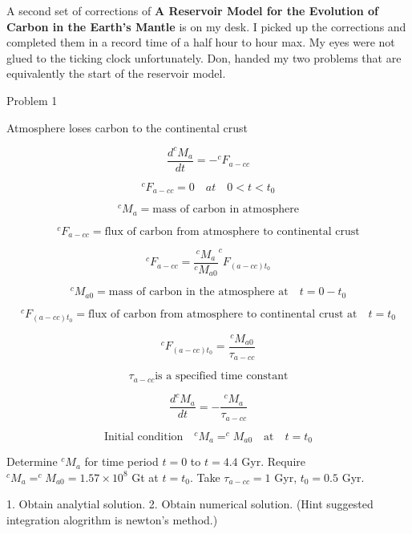 A second set of corrections of \textbf{A Reservoir Model for the Evolution of Carbon in the Earth's Mantle} is on my desk. I picked up the corrections and completed them in a record time of a half hour to hour max. My eyes were not glued to the ticking clock unfortunately. Don, handed my two problems that are equivalently the start of the reservoir model. 

Problem 1

Atmosphere loses carbon to the continental crust

\begin{equation}
  \frac{d^{c}M_{a}}{dt} = -^{c}F_{a-cc}
\end{equation}

\begin{equation}
  ^{c}F_{a-cc} = 0 \quad at \quad 0 < t < t_0
\end{equation}

\begin{equation}
  ^{c}M_{a} = \text{mass of carbon in atmosphere}
\end{equation}

\begin{equation}
  ^{c}F_{a-cc} = \text{flux of carbon from atmosphere to continental crust}
\end{equation}

\begin{equation}
  ^{c}F_{a-cc} = \frac{^{c}M_{a}}{^{c}M_{a0}} ^{c}F_{(a-cc)t_{0}}
\end{equation}

\begin{equation}
  ^{c}M_{a0} = \text{mass of carbon in the atmosphere at} \quad t = 0 - t_{0}
\end{equation}

\begin{equation}
  ^{c}F_{(a-cc)t_{0}} = \text{flux of carbon from atmosphere to continental crust at} \quad t=t_0
\end{equation}

\begin{equation}
  ^{c}F_{(a-cc)t_{0}} = \frac{^{c}M_{a0}}{\tau_{a-cc}}
\end{equation}

\begin{equation}
  \tau_{a-cc} \text{is a specified time constant}
\end{equation}

\begin{equation}
  \frac{d^{c}M_{a}}{dt} = - \frac{^{c}M_a}{\tau_{a-cc}}
\end{equation}

\begin{equation}
  \text{Initial condition} \quad ^{c}M_{a} = ^{c}M_{a0} \quad \text{at} \quad t=t_{0}
\end{equation}

Determine $^{c}M_{a}$ for time period $t=0$ to $t=4.4$ Gyr. Require $^{c}M_{a} = ^{c}M_{a0} = 1.57 \times 10^8$ Gt at $t = t_0$. Take $\tau_{a-cc} = 1$ Gyr, $t_{0} = 0.5$ Gyr.

1. Obtain analytial solution.
2. Obtain numerical solution. (Hint suggested integration alogrithm is newton's method.)
